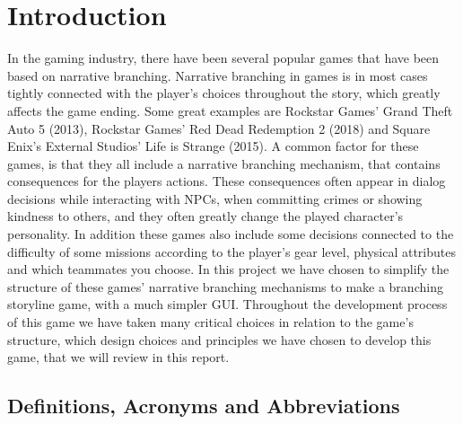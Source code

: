 \documentclass[British]{article}
\begin{document}
\section{Introduction}
In the gaming industry, there have been several popular games that have been based on narrative branching. Narrative branching in games is in most cases tightly connected with the player's choices throughout the story, which greatly affects the game ending. Some great examples are Rockstar Games' Grand Theft Auto 5 (2013), Rockstar Games' Red Dead Redemption 2 (2018) and Square Enix's External Studios' Life is Strange (2015)\cite{miller2023}. A common factor for these games, is that they all include a narrative branching mechanism, that contains consequences for the players actions. These consequences often appear in dialog decisions while interacting with NPCs, when committing crimes or showing kindness to others, and they often greatly change the played character's personality. In addition these games also include some decisions connected to the difficulty of some missions according to the player's gear level, physical attributes and which teammates you choose. In this project we have chosen to simplify the structure of these games' narrative branching mechanisms to make a branching storyline game, with a much simpler GUI. Throughout the development process of this game we have taken many critical choices in relation to the game's structure, which design choices and principles we have chosen to develop this game, that we will review in this report.

\subsection{Definitions, Acronyms and Abbreviations}

\begin{center}
\end{center}
\end{document}
